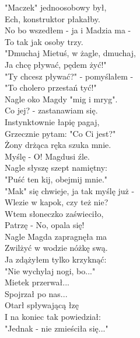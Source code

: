 "Maczek" jednoosobowy był, \\
Ech, konstruktor płakałby. \\
No bo wszedłem - ja i Madzia ma - \\
To tak jak osoby trzy. \\
"Dmuchaj Mietuś, w żagle, dmuchaj, \\
Ja chcę pływać, pędem żyć!" \\
"Ty chcesz pływać?" - pomyślałem - \\
"To cholero przestań tyć!" \\

Nagle oko Magdy "mig i mryg". \\
Co jej? - zastanawiam się. \\
Instynktownie łapię pagaj, \\
Grzecznie pytam: "Co Ci jest?" \\
Żony drżąca ręka szuka mnie. \\
Myślę - O! Magdusi źle. \\
Nagle słyszę szept namiętny: \\
"Puść ten kij, obejmij mnie." \\

"Mak" się chwieje, ja tak myślę już - \\
Wlezie w kapok, czy też nie? \\
Wtem słoneczko zaświeciło, \\
Patrzę - No, opala się! \\
Nagle Magda zapragnęła ma \\
Zwilżyć w wodzie nóżkę swą. \\
Ja zdążyłem tylko krzyknąć: \\
"Nie wychylaj nogi, bo..." \\

Mietek przerwał... \\
Spojrzał po nas... \\
Otarł spływającą łzę \\
I na koniec tak powiedział: \\
"Jednak - nie zmieściła się..." \\